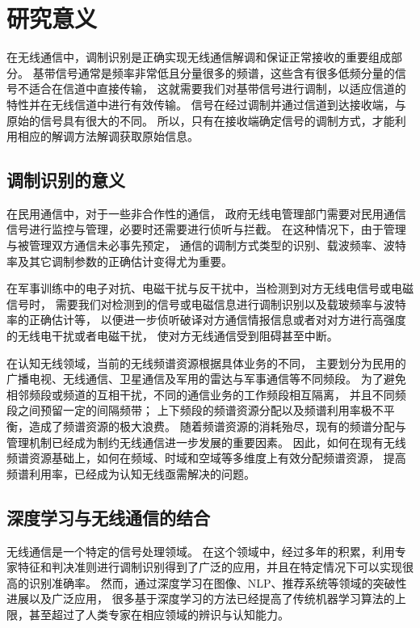 \section{研究意义}

在无线通信中，调制识别是正确实现无线通信解调和保证正常接收的重要组成部分。
基带信号通常是频率非常低且分量很多的频谱，这些含有很多低频分量的信号不适合在信道中直接传输，
这就需要我们对基带信号进行调制，以适应信道的特性并在无线信道中进行有效传输。
信号在经过调制并通过信道到达接收端，与原始的信号具有很大的不同。
所以，只有在接收端确定信号的调制方式，才能利用相应的解调方法解调获取原始信息。\par

\subsection{调制识别的意义}
在民用通信中，对于一些非合作性的通信，
政府无线电管理部门需要对民用通信信号进行监控与管理，必要时还需要进行侦听与拦截。
在这种情况下，由于管理与被管理双方通信未必事先预定，
通信的调制方式类型的识别、载波频率、波特率及其它调制参数的正确估计变得尤为重要。\par

在军事训练中的电子对抗、电磁干扰与反干扰中，当检测到对方无线电信号或电磁信号时，
需要我们对检测到的信号或电磁信息进行调制识别以及载玻频率与波特率的正确估计等，
以便进一步侦听破译对方通信情报信息或者对对方进行高强度的无线电干扰或者电磁干扰，
使对方无线通信受到阻碍甚至中断。\par

在认知无线领域，当前的无线频谱资源根据具体业务的不同，
主要划分为民用的广播电视、无线通信、卫星通信及军用的雷达与军事通信等不同频段。
为了避免相邻频段或频道的互相干扰，不同的通信业务的工作频段相互隔离，
并且不同频段之间预留一定的间隔频带；
上下频段的频谱资源分配以及频谱利用率极不平衡，造成了频谱资源的极大浪费。
随着频谱资源的消耗殆尽，现有的频谱分配与管理机制已经成为制约无线通信进一步发展的重要因素。
因此，如何在现有无线频谱资源基础上，如何在频域、时域和空域等多维度上有效分配频谱资源，
提高频谱利用率，已经成为认知无线亟需解决的问题。\par

\subsection{深度学习与无线通信的结合}

无线通信是一个特定的信号处理领域。 
在这个领域中，经过多年的积累，利用专家特征和判决准则进行调制识别得到了广泛的应用，并且在特定情况下可以实现很高的识别准确率。
然而，通过深度学习在图像、NLP、推荐系统等领域的突破性进展以及广泛应用，
很多基于深度学习的方法已经提高了传统机器学习算法的上限，甚至超过了人类专家在相应领域的辨识与认知能力。\par

